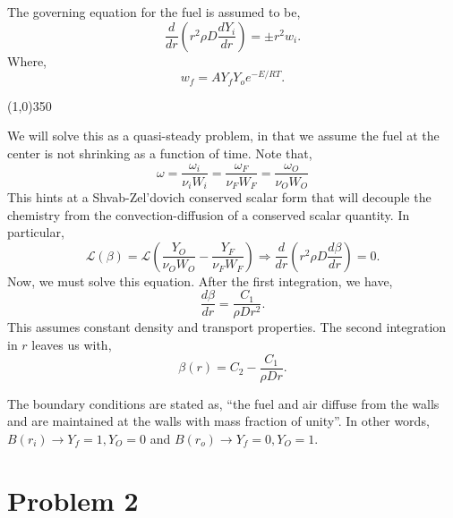 \documentclass{article}
\begin{document}
The governing equation for the fuel is assumed to be, 
\begin{equation*}
 \frac{d}{dr}\left( r^2 \rho D \frac{dY_i}{dr}\right) = \pm r^2 w_i. 
\end{equation*}
Where, 
\begin{equation*}
 w_f = A Y_f Y_o e^{-E/RT}.
\end{equation*}
\begin{center}
\line(1,0){350}
\end{center}
We will solve this as a quasi-steady problem, in that we assume the fuel
at the center is not shrinking as a function of time. Note that, 
\begin{equation*}
\omega = \frac{\omega_i}{\nu_i W_i}= \frac{\omega_F}{\nu_F W_F} =
 \frac{\omega_O}{\nu_O W_O} 
\end{equation*}
This hints at a Shvab-Zel'dovich conserved scalar form that will
decouple the chemistry from the convection-diffusion of a conserved
scalar quantity. In particular, 
\begin{equation*}
\mathcal{L}\left(\beta \right) = \mathcal{L}\left( \frac{Y_O}{\nu_O W_O}
	    - \frac{Y_F}{\nu_F W_F} \right) \Rightarrow \frac{d}{dr}\left( r^2
	    \rho D \frac{d \beta}{dr}\right) = 0 .
\end{equation*}
Now, we must solve this equation. After the first integration, we have, 
\begin{equation*}
\frac{d \beta}{dr} = \frac{C_1}{ \rho D r^2 }.
\end{equation*}
This assumes constant density and transport properties. The second
integration in $r$ leaves us with, 
\begin{equation*}
\beta(r) = C_2 - \frac{C_1}{ \rho D r }.
\end{equation*}

The boundary conditions are stated as, ``the fuel and air diffuse from the walls
and are maintained at the walls with mass fraction of unity''. In other
words, $B(r_i) \rightarrow Y_f = 1, Y_O = 0 $ and $B(r_o) \rightarrow
Y_f = 0, Y_O = 1$. 

\newpage
\section*{Problem 2}
\end{document}
